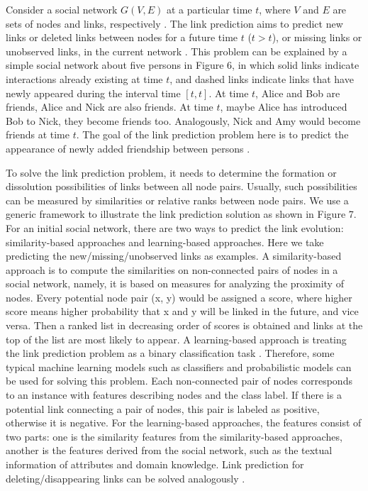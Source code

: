 Consider a social network $G(V,E)$ at a particular time $t$, where $V$ and $E$ are sets of nodes and links, respectively \cite{wang2014link}. The link prediction aims to predict new links or deleted links between nodes for a future time $t$ ($t > t$), or missing links or unobserved links, in the current network \cite{wang2014link}. This problem can be explained by a simple social network about five persons in Figure 6, in which solid links indicate interactions already existing at time $t$, and dashed links indicate links that have newly appeared during the interval time $[t, t]$. At time $t$, Alice and Bob are friends, Alice and Nick are also friends. At time $t$, maybe Alice has introduced Bob to Nick, they become friends too. Analogously, Nick and Amy would become friends at time $t$. The goal of the link prediction problem here is to predict the appearance of newly added friendship between persons \cite{wang2014link}.

To solve the link prediction problem, it needs to determine the formation or dissolution possibilities of links between all node pairs. Usually, such possibilities can be measured by similarities or relative ranks between node pairs. We use a generic framework to illustrate the link prediction solution as shown in Figure 7. For an initial social network, there are two ways to predict the link evolution: similarity-based approaches and learning-based approaches. Here we take predicting the new/missing/unobserved links as examples. A similarity-based approach is to compute the similarities on non-connected pairs of nodes in a social network, namely, it is based on measures for analyzing the proximity of nodes. Every potential node pair (x, y) would be assigned a score, where higher score means higher probability that x and y will be linked in the future, and vice versa. Then a ranked list in decreasing order of scores is obtained and links at the top of the list are most likely to appear. A learning-based approach is treating the link prediction problem as a binary classification task \cite{al2006link}. Therefore, some typical machine learning models such as classifiers and probabilistic models can be used for solving this problem. Each non-connected pair of nodes corresponds to an instance with features describing nodes and the class label. If there is a potential link connecting a pair of nodes, this pair is labeled as positive, otherwise it is negative. For the learning-based approaches, the features consist of two parts: one is the similarity features from the similarity-based approaches, another is the features derived from the social network, such as the textual information of attributes and domain knowledge. Link prediction for deleting/disappearing links can be solved analogously \cite{wang2014link}.

